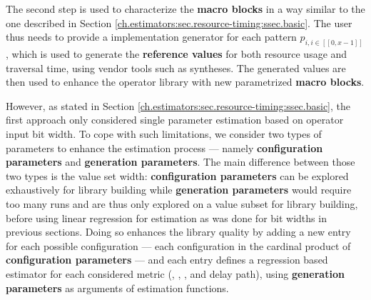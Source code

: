         The second step is used to characterize the {\bf macro blocks} in a way similar to the one described in Section \ref{ch.estimators:sec.resource-timing:ssec.basic}.
        The user thus needs to provide a \chisel{} implementation generator for each pattern $p_{i, i \in [\![0, x-1]\!]}$, which is used to generate the {\bf reference values} for both resource usage and traversal time, using vendor tools such as \vivado{} syntheses.
        The generated values are then used to enhance the operator library with new parametrized {\bf macro blocks}.
        
        However, as stated in Section \ref{ch.estimators:sec.resource-timing:ssec.basic}, the first approach only considered single parameter estimation based on operator input bit width.
        To cope with such limitations, we consider two types of parameters to enhance the estimation process --- namely {\bf configuration parameters} and {\bf generation parameters}.
        The main difference between those two types is the value set width: {\bf configuration parameters} can be explored exhaustively for library building while {\bf generation parameters} would require too many runs and are thus only explored on a value subset for library building, before using linear regression for estimation as was done for bit widths in previous sections.
        Doing so enhances the library quality by adding a new entry for each possible configuration --- \ie each configuration in the cardinal product of {\bf configuration parameters} --- and each entry defines a regression based estimator for each considered metric (, , ,  and delay path), using {\bf generation parameters} as arguments of estimation functions.
        
